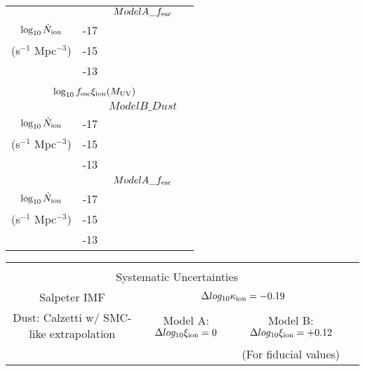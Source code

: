 \begin{table}
\begin{tabular}{cc|cccccc}
	  & & \multicolumn{5}{c}{$ModelA\_f_{\rm{esc}}$}\\
	  
$\log_{10} \dot{N}_{\rm{ion}}$	 		& -17 &  \\
(s$^{-1}$ Mpc$^{-3}$) 				& -15 &  \\
												& -13 &  \\											

	 \multicolumn{7}{c}{}\\
	 \multicolumn{7}{c}{$\log_{10}f_{\rm{esc}}\xi_{\rm{ion}}(M_{\rm{UV}})$}\\\hline
	 
	  & & \multicolumn{5}{c}{$ModelB\_Dust$}\\
	  
$\log_{10} \dot{N}_{\rm{ion}}$	 		& -17 &  \\
(s$^{-1}$ Mpc$^{-3}$) 				& -15 &  \\
												& -13 &  \\
												
	  & & \multicolumn{5}{c}{$ModelA\_f_{\rm{esc}}$}\\
	  
$\log_{10} \dot{N}_{\rm{ion}}$	 		& -17 &  \\
(s$^{-1}$ Mpc$^{-3}$) 				& -15 &  \\
												& -13 &  \\		

\end{tabular}
 \begin{tabular}{cc|cccccc}
	 \multicolumn{7}{c}{}\\
	 \multicolumn{7}{c}{Systematic Uncertainties}\\\hline
	 \multicolumn{2}{c}{Salpeter IMF} & \multicolumn{5}{c}{$\Delta log_{10}\kappa_{\rm{ion}} = -0.19$}\\
	 \multicolumn{2}{c}{Dust: Calzetti w/ SMC-like extrapolation} &  \multicolumn{2}{c}{Model A: $\Delta log_{10}\xi_{\rm{ion}} = 0$} & \multicolumn{3}{c}{Model B: $\Delta log_{10}\xi_{\rm{ion}} = +0.12$}\\
	 \multicolumn{2}{c}{} &  \multicolumn{2}{c}{} & \multicolumn{3}{c}{ (For fiducial values)}\\
 

\end{tabular}
\end{table}
